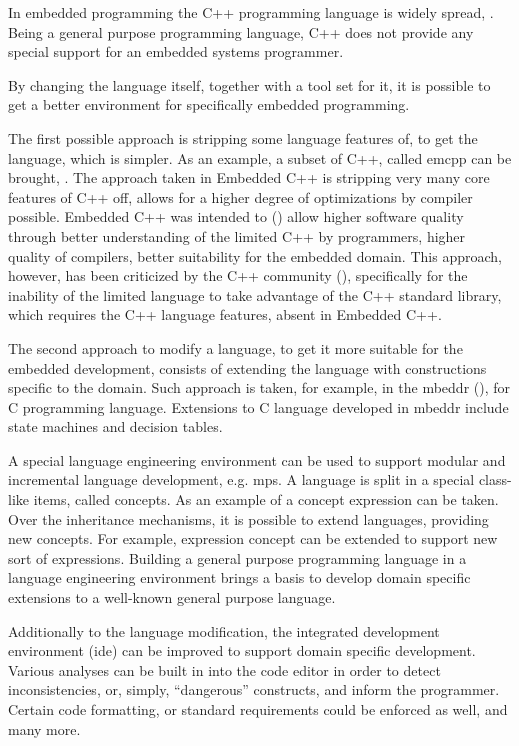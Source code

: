 

In embedded programming the C++ programming language is widely spread, \cite{embedlangs}. Being a general purpose 
programming language, C++ does not provide any special support for an embedded systems programmer. 

By changing  the language itself, together with a tool set for it, it is possible to get a better environment 
for specifically embedded programming. 

The first possible approach is stripping some language features of, to get the language, which is simpler. 
As an example, a subset of C++, called \Gls{emcpp} can be brought, \cite{emcpp}. The approach taken in Embedded C++ is 
stripping very many core features of C++ off, allows for a higher degree of optimizations by compiler possible. 
Embedded C++ was intended to (\cite{stripepp}) allow higher software quality through better understanding of the limited 
C++ by programmers, higher quality of compilers, better suitability for the embedded domain. 
This approach, however, has been criticized by the C++ community (\cite{stremcpp}), specifically for the inability of the 
limited language to take advantage of the C++ standard library, which requires the C++ language features, absent in 
Embedded C++.

The second approach to modify a language, to get it more suitable for the embedded development, consists of extending 
the language with constructions specific to the domain. Such approach is taken, for example, in the \gls{mbeddr} 
(\cite{2012_voelter_mbeddr_extensible_c_based_language_and_ide_for_embedded}), for C programming language. 
Extensions to C language developed in \gls{mbeddr} include state machines and decision tables.

A special language engineering environment can be used to support modular and incremental language development, e.g. \Gls{mps}.
A language is split in a special class-like items, called \glspl{concept}. As an example of a concept expression can be taken. Over 
the inheritance mechanisms, it is possible to extend languages, providing new concepts. For example, expression concept can
be extended to support new sort of expressions. Building a general purpose programming language in a language engineering
environment brings a basis to develop domain specific extensions to a well-known general purpose language.

Additionally to the language modification, the integrated development environment (\gls{ide}) can 
be improved to support domain specific development. Various analyses can be built in into the code 
editor in order to detect inconsistencies, or, simply, ``dangerous'' constructs, and inform the programmer.
Certain code formatting, or standard requirements could be enforced as well, and many more.

